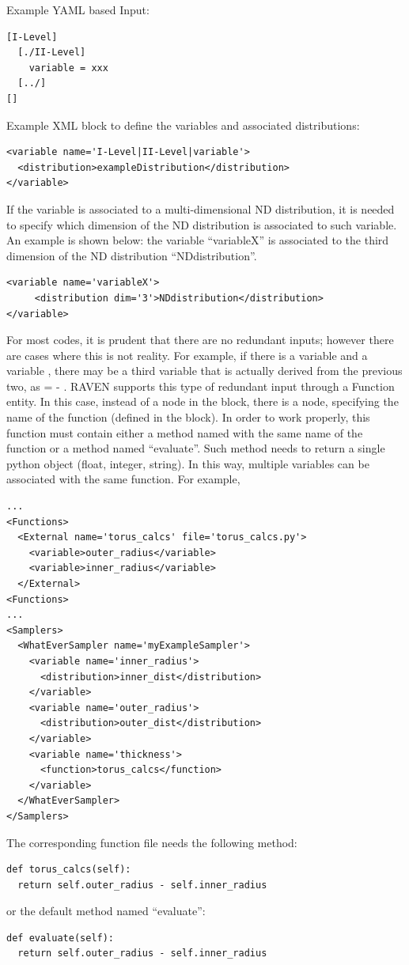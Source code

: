 Example YAML based Input:
\begin{lstlisting}
[I-Level]
  [./II-Level]
    variable = xxx
  [../]
[]
\end{lstlisting}

Example XML block to define the variables and associated distributions:
\begin{lstlisting}[style=XML]
<variable name='I-Level|II-Level|variable'>
  <distribution>exampleDistribution</distribution>
</variable>
\end{lstlisting}

If the variable is associated to a multi-dimensional ND distribution, it is needed to specify which dimension of the ND distribution is associated to such variable. An example is shown below: the variable  ``variableX'' is associated to the third dimension of the ND distribution ``NDdistribution''.

\begin{lstlisting}[style=XML]
<variable name='variableX'>
     <distribution dim='3'>NDdistribution</distribution>
</variable>
\end{lstlisting}

For most codes, it is prudent that there are no redundant inputs; however there are
cases where this is not reality.  For example, if there is a variable  and
a variable , there may be a third variable  that
is actually derived from the previous two, as  =  - .
RAVEN supports this type of redundant input through a Function entity.  In this case,
instead of a  node in the  block, there is a
 node, specifying the name of the function (defined in the  block).
In order to work properly, this function must contain either a method named with the same name of the function or a method named ``evaluate''. 
Such method needs to return a single python object (float, integer, string). In this way, multiple variables can be associated with the same function.  For example,
\begin{lstlisting}[style=XML]
...
<Functions>
  <External name='torus_calcs' file='torus_calcs.py'>
    <variable>outer_radius</variable>
    <variable>inner_radius</variable>
  </External>
<Functions>
...
<Samplers>
  <WhatEverSampler name='myExampleSampler'>
    <variable name='inner_radius'>
      <distribution>inner_dist</distribution>
    </variable>
    <variable name='outer_radius'>
      <distribution>outer_dist</distribution>
    </variable>
    <variable name='thickness'>
      <function>torus_calcs</function>
    </variable>
  </WhatEverSampler>
</Samplers>
\end{lstlisting}
The corresponding function file  needs the following method:
\begin{lstlisting}
def torus_calcs(self):
  return self.outer_radius - self.inner_radius
\end{lstlisting}
or the default method named ``evaluate'':
\begin{lstlisting}
def evaluate(self):
  return self.outer_radius - self.inner_radius
\end{lstlisting}

